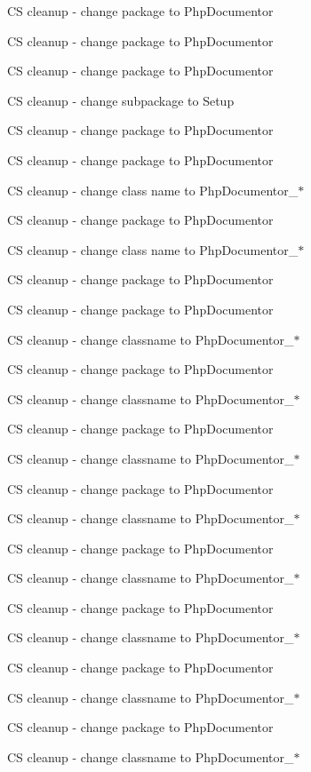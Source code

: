 \begin{DoxyRefList}
\-C\-S cleanup -\/ change package to \-Php\-Documentor 

\-C\-S cleanup -\/ change package to \-Php\-Documentor 

\-C\-S cleanup -\/ change package to \-Php\-Documentor 

\-C\-S cleanup -\/ change subpackage to \-Setup 

\-C\-S cleanup -\/ change package to \-Php\-Documentor 

\-C\-S cleanup -\/ change package to \-Php\-Documentor 

\-C\-S cleanup -\/ change class name to \-Php\-Documentor\-\_\-$\ast$ 

\-C\-S cleanup -\/ change package to \-Php\-Documentor 

\-C\-S cleanup -\/ change class name to \-Php\-Documentor\-\_\-$\ast$ 

\-C\-S cleanup -\/ change package to \-Php\-Documentor 

\-C\-S cleanup -\/ change package to \-Php\-Documentor 

\-C\-S cleanup -\/ change classname to \-Php\-Documentor\-\_\-$\ast$ 

\-C\-S cleanup -\/ change package to \-Php\-Documentor 

\-C\-S cleanup -\/ change classname to \-Php\-Documentor\-\_\-$\ast$ 

\-C\-S cleanup -\/ change package to \-Php\-Documentor 

\-C\-S cleanup -\/ change classname to \-Php\-Documentor\-\_\-$\ast$ 

\-C\-S cleanup -\/ change package to \-Php\-Documentor 

\-C\-S cleanup -\/ change classname to \-Php\-Documentor\-\_\-$\ast$ 

\-C\-S cleanup -\/ change package to \-Php\-Documentor 

\-C\-S cleanup -\/ change classname to \-Php\-Documentor\-\_\-$\ast$ 

\-C\-S cleanup -\/ change package to \-Php\-Documentor 

\-C\-S cleanup -\/ change classname to \-Php\-Documentor\-\_\-$\ast$ 

\-C\-S cleanup -\/ change package to \-Php\-Documentor 

\-C\-S cleanup -\/ change classname to \-Php\-Documentor\-\_\-$\ast$ 

\-C\-S cleanup -\/ change package to \-Php\-Documentor 

\-C\-S cleanup -\/ change classname to \-Php\-Documentor\-\_\-$\ast$ 


\end{DoxyRefList}
